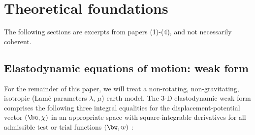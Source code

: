 \section{Theoretical foundations}
The following sections are excerpts from papers (1)-(4), and not necessarily coherent.

\subsection{Elastodynamic equations of motion: weak form}
For the remainder of this paper, we will treat a non-rotating,
non-gravitating, isotropic (Lam\'{e} parameters $\lambda$, $\mu$)
earth model. The 3-D elastodynamic weak form comprises the following
three integral equalities for the displacement-potential vector
$(\bu,\chi)$ in an appropriate space with square-integrable derivatives
for all admissible test or trial functions $(\bw,w)$ \citep{nissen+:07a}:
%
\eqa \label{eq:weak1}
\nonumber\\
\ena
%
\eqa \label{eq:weak2}
\ena
%
\eqa \label{eq:weak3}
\nonumber\\
